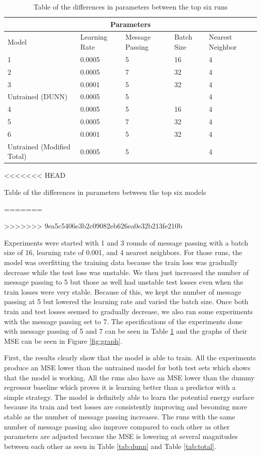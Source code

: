 \documentclass[12pt, abstract = true]{scrartcl}
\begin{document}
\begin{table}
    \centering
    \begin{tabular}{|p{3cm}||p{2cm}|p{2cm}|p{2cm}|p{2cm}|}
    \hline
    \multicolumn{5}{|c|}{Parameters} \\
    \hline
    Model & Learning Rate & Message Passing & Batch Size & Nearest Neighbor\\
    \hline
    1 & 0.0005 & 5 & 16 & 4\\
    2 & 0.0005 & 7 & 32 & 4\\    
    3 & 0.0001 & 5 & 32 & 4\\
    Untrained (DUNN) & 0.0005 & 5 & & 4\\
    4 & 0.0005 & 5 & 16 & 4\\
    5 & 0.0005 & 7 & 32 & 4\\
    6 & 0.0001 & 5 & 32 & 4\\
    Untrained (Modified Total) & 0.0005 & 5 & & 4\\
    \hline
    
    \end{tabular}
<<<<<<< HEAD
    \caption{Table of the differences in parameters between the top six models}\label{tab:param}
=======
    \caption{Table of the differences in parameters between the top six runs}\label{tab:param}
>>>>>>> 9ea5c5406e3b2c09082eb626ea0e32b213fe210b
\end{table}

Experiments were started with 1 and 3 rounds of message passing with a batch size of 16, learning rate of 0.001, and 4 nearest neighbors. For those runs, the model was overfitting the training data because the train loss was gradually decrease while the test loss was unstable. We then just increased the number of message passing to 5 but those as well had unstable test losses even when the train losses were very stable. Because of this, we kept the number of message passing at 5 but lowered the learning rate and varied the batch size. Once both train and test losses seemed to gradually decrease, we also ran some experiments with the message passing set to 7. The specifications of the experiments done with message passing of 5 and 7 can be seen in Table \ref{tab:param} and the graphs of their MSE can be seen in Figure \ref{fig:graph}.

First, the results clearly show that the model is able to train. All the experiments produce an MSE lower than the untrained model for both test sets which shows that the model is working. All the runs also have an MSE lower than the dummy regressor baseline which proves it is learning better than a predictor with a simple strategy. The model is definitely able to learn the potential energy surface because its train and test losses are consistently improving and becoming more stable as the number of message passing increases. The runs with the same number of message passing also improve compared to each other as other parameters are adjusted because the MSE is lowering at several magnitudes between each other as seen in Table \ref{tab:dunn} and Table \ref{tab:total}.
\end{document}
